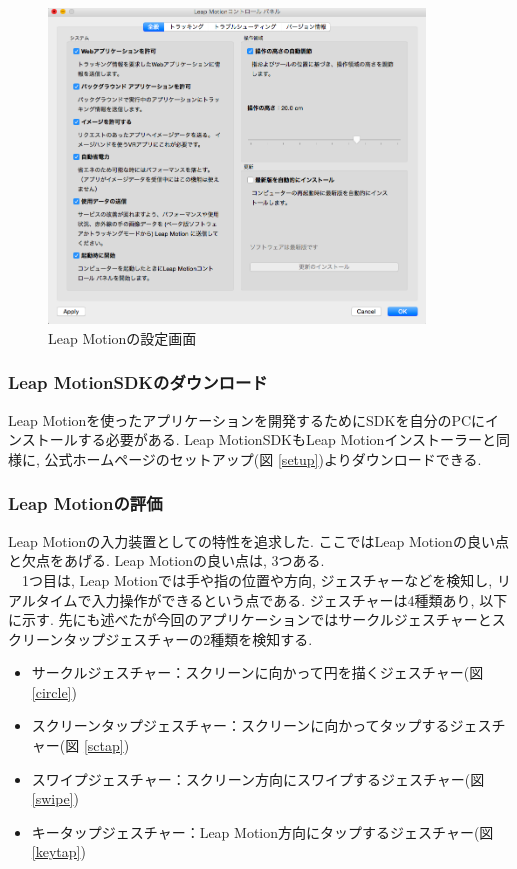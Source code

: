 \documentclass{funthesis}
\begin{document}
\begin{figure}[H]
 \begin{center}
  \includegraphics[width=100mm]{./img/Lset.png}
 \end{center}
 \caption{Leap Motionの設定画面}
 \label{Lset}
\end{figure}

\subsubsection{Leap MotionSDKのダウンロード}
Leap Motionを使ったアプリケーションを開発するためにSDKを自分のPCにインストールする必要がある. Leap MotionSDKもLeap Motionインストーラーと同様に, 公式ホームページのセットアップ(図 \ref{setup})よりダウンロードできる. 


\subsubsection{Leap Motionの評価}
Leap Motionの入力装置としての特性を追求した. ここではLeap Motionの良い点と欠点をあげる. Leap Motionの良い点は, 3つある. \\ 
　1つ目は, Leap Motionでは手や指の位置や方向, ジェスチャーなどを検知し, リアルタイムで入力操作ができるという点である. ジェスチャーは4種類あり, 以下に示す. 先にも述べたが今回のアプリケーションではサークルジェスチャーとスクリーンタップジェスチャーの2種類を検知する. \\

\begin{itemize}
 \item サークルジェスチャー：スクリーンに向かって円を描くジェスチャー(図 \ref{circle})
 \item スクリーンタップジェスチャー：スクリーンに向かってタップするジェスチャー(図 \ref{sctap})
 \item スワイプジェスチャー：スクリーン方向にスワイプするジェスチャー(図 \ref{swipe})
 \item キータップジェスチャー：Leap Motion方向にタップするジェスチャー(図 \ref{keytap})
\end{itemize}
\end{document}
